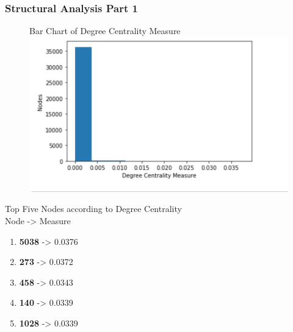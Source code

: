 \documentclass{beamer}
\begin{document}
\begin{frame}
\frametitle{Structural Analysis Part 1}
	\begin{multicols}{2}
		\begin{figure}
	        {\tiny Bar Chart of Degree Centrality Measure}
		\includegraphics[width=\columnwidth]{degree-cent.png}
		\end{figure}
		\columnbreak
		{\tiny Top Five Nodes according to Degree Centrality} \\
		Node  ->  Measure
		\begin{enumerate} 
		\item \textbf{5038} -> 0.0376
		\item \textbf{273} -> 0.0372
		\item \textbf{458} -> 0.0343
		\item \textbf{140} -> 0.0339
		\item \textbf{1028} -> 0.0339
		\end{enumerate} 
	\end{multicols}
\end{frame}
\end{document}
